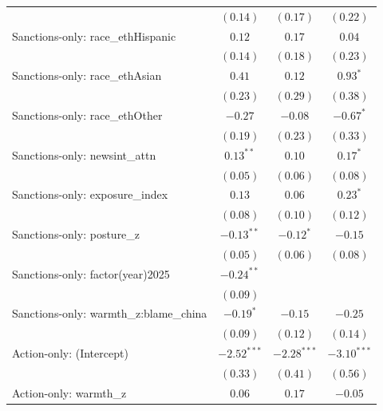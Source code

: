 \begin{tabular}{l c c c}
                                       & $(0.14)$      & $(0.17)$      & $(0.22)$      \\
Sanctions-only: race\_ethHispanic      & $0.12$        & $0.17$        & $0.04$        \\
                                       & $(0.14)$      & $(0.18)$      & $(0.23)$      \\
Sanctions-only: race\_ethAsian         & $0.41$        & $0.12$        & $0.93^{*}$    \\
                                       & $(0.23)$      & $(0.29)$      & $(0.38)$      \\
Sanctions-only: race\_ethOther         & $-0.27$       & $-0.08$       & $-0.67^{*}$   \\
                                       & $(0.19)$      & $(0.23)$      & $(0.33)$      \\
Sanctions-only: newsint\_attn          & $0.13^{**}$   & $0.10$        & $0.17^{*}$    \\
                                       & $(0.05)$      & $(0.06)$      & $(0.08)$      \\
Sanctions-only: exposure\_index        & $0.13$        & $0.06$        & $0.23^{*}$    \\
                                       & $(0.08)$      & $(0.10)$      & $(0.12)$      \\
Sanctions-only: posture\_z             & $-0.13^{**}$  & $-0.12^{*}$   & $-0.15$       \\
                                       & $(0.05)$      & $(0.06)$      & $(0.08)$      \\
Sanctions-only: factor(year)2025       & $-0.24^{**}$  &               &               \\
                                       & $(0.09)$      &               &               \\
Sanctions-only: warmth\_z:blame\_china & $-0.19^{*}$   & $-0.15$       & $-0.25$       \\
                                       & $(0.09)$      & $(0.12)$      & $(0.14)$      \\
Action-only: (Intercept)               & $-2.52^{***}$ & $-2.28^{***}$ & $-3.10^{***}$ \\
                                       & $(0.33)$      & $(0.41)$      & $(0.56)$      \\
Action-only: warmth\_z                 & $0.06$        & $0.17$        & $-0.05$       \\

\end{tabular}
